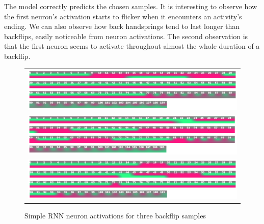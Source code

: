 The model correctly predicts the chosen samples. It is interesting to observe how the first neuron's activation starts to flicker when it encounters an activity's ending. We can also observe how back handsprings tend to last longer than backflips, easily noticeable from neuron activations. The second observation is that the first neuron seems to activate throughout almost the whole duration of a backflip. 

\begin{figure}
   \centering
\begin{tabular}{c}
\includegraphics[width=\textwidth]{images/classifier/neuron-activations-simple-rnn-model-3/backflip-23-tiit}\\
\includegraphics[width=\textwidth]{images/classifier/neuron-activations-simple-rnn-model-3/backflip-40-margus}\\
\includegraphics[width=\textwidth]{images/classifier/neuron-activations-simple-rnn-model-3/backflip-6-rasmus}\\
\end{tabular}
    \caption{Simple RNN neuron activations for three backflip samples}
    \label{backflip-neuron-activations-simple-rnn}
\end{figure}

